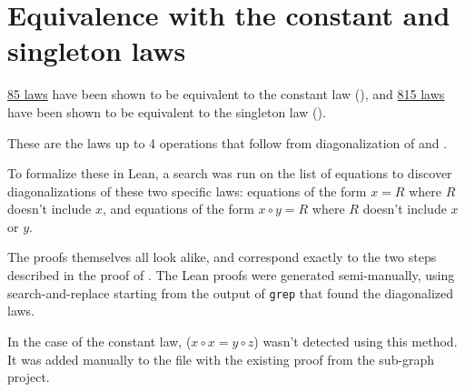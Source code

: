 \chapter{Equivalence with the constant and singleton laws}

\href{https://github.com/teorth/equational_theories/blob/main/equational_theories/Generated/Constant.lean}{85 laws}
have been shown to be equivalent to the constant law (), and
\href{https://github.com/teorth/equational_theories/blob/main/equational_theories/Generated/Singleton.lean}{815 laws}
have been shown to be equivalent to the singleton law ().

These are the laws up to 4 operations that follow from diagonalization of  and .

To formalize these in Lean, a search was run on the list of equations to discover
diagonalizations of these two specific laws: equations of the form $x = R$ where $R$ doesn't include
$x$, and equations of the form $x \circ y = R$ where $R$ doesn't include $x$ or $y$.

The proofs themselves all look alike, and correspond exactly to the two steps described in the proof
of . The Lean proofs were generated semi-manually, using search-and-replace starting from
the output of \texttt{grep} that found the diagonalized laws.

In the case of the constant law,  ($x \circ x = y \circ z$) wasn't detected using
this method. It was added manually to the file with the existing proof from the sub-graph project.
